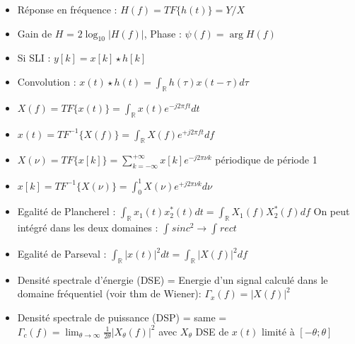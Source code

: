 \documentclass{article}
\begin{document}
\begin{multicols}{2}
\begin{itemize}
        \item Réponse en fréquence : $ H(f) = TF\{h(t)\} = Y / X $ 
        \item Gain de $ H $ = $ 2 \log_{10} \left| H(f) \right|  $, Phase : $ \psi(f) = \arg H(f) $ 
        \item Si SLI : $ y[k] = x[k] \star h[k] $ 
        \item Convolution : $ x(t) \star h(t) = \int_{\mathbb{R}}^{}h(\tau )x(t - \tau )d\tau $ 
        \item $ X(f) = TF\{x(t)\} = \int_{\mathbb{R}}^{} x(t) e^{-j 2 \pi ft}dt $ 
        \item $ x(t) = TF^{-1}\{X(f)\} = \int_{\mathbb{R}}^{} X(f) e^{+j 2 \pi ft}df $ 
        \item $ X(\nu ) = TF\{x[k]\} = \sum_{k = -\infty }^{+ \infty }x[k] e^{- j 2 \pi \nu k}$ périodique de période 1
        \item $ x[k] = TF^{-1} \{X(\nu )\} = \int_{0}^{1}X(\nu ) e^{+j 2 \pi \nu k} d \nu $
        \item Egalité de Plancherel : $ \int_{\mathbb{R}}^{}x_1(t)x_2^*(t) dt = \int_{\mathbb{R}}^{}X_1(f)X_2^*(f) df $ On peut intégré dans les deux domaines : $ \int_{}^{}sinc^2 \to \int_{}^{}rect  $ 
        \item Egalité de Parseval : $ \int_{\mathbb{R}}^{}\left| x(t) \right| ^2 dt = \int_{\mathbb{R}}^{}\left| X(f) \right| ^2df $ 
        \item Densité spectrale d'énergie (DSE) = Energie d'un signal calculé dans le domaine fréquentiel (voir thm de Wiener): $ \Gamma _x (f) = \left| X(f) \right| ^2 $ 
        \item Densité spectrale de puissance (DSP) = same = $ \Gamma _c (f) = \lim_{\theta  \to \infty} \frac{1}{2 \theta } \left| X_\theta (f) \right| ^2 $ avec $ X_\theta  $ DSE de $ x(t) $ limité à $ [-\theta ; \theta ] $ 
    \end{itemize}
    
    

\end{multicols}
\end{document}
